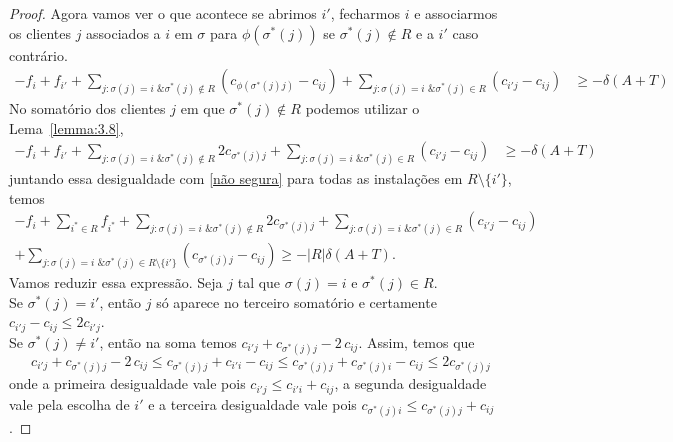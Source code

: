 \begin{proof}
    Agora vamos ver o que acontece se abrimos $i'$, fecharmos $i$ e associarmos os clientes $j$ associados a $i$ em $\sigma$ para $\phi(\sigma^*(j))$ se $\sigma^*(j) \not \in R$ e a $i'$ caso contrário.
    \begin{align*}
        - f_i + f_{i'} + \sum_{j: \sigma(j) = i \text{ \& } \sigma^*(j)\not \in R}(c_{\phi(\sigma^*(j)j)} - c_{ij}) + \sum_{j: \sigma(j)=i \text{ \& }\sigma^*(j) \in R}(c_{i'j} - c_{ij}) &\geq -\delta(A+T)
    \end{align*}
    No somatório dos clientes $j$ em que $\sigma^*(j) \not \in R$ podemos utilizar o Lema~\ref{lemma:3.8},
    \begin{align*}
        - f_i + f_{i'} + \sum_{j: \sigma(j) = i \text{ \& } \sigma^*(j)\not \in R} 2c_{\sigma^*(j)j} + \sum_{j: \sigma(j)=i \text{ \& }\sigma^*(j) \in R}(c_{i'j} - c_{ij}) &\geq -\delta(A+T)
    \end{align*}
    juntando essa desigualdade com \ref{não segura} para todas as instalações em $R\setminus\{i'\}$, temos
    \begin{align*}
        -f_i + \sum_{i^* \in R}f_{i^*} + \sum_{j: \sigma(j) = i \text{ \& } \sigma^*(j)\not \in R} 2c_{\sigma^*(j)j} + \sum_{j: \sigma(j)=i \text{ \& }\sigma^*(j) \in R}(c_{i'j} - c_{ij}) \\+ \sum_{j:\sigma(j)=i \text{ \& }\sigma^*(j) \in R \setminus\{i'\}}(c_{\sigma^*(j)j} - c_{ij}) \geq -|R|\delta(A+T).
    \end{align*}
    Vamos reduzir essa expressão. Seja $j$ tal que $\sigma(j)=i$ e $\sigma^*(j) \in R$. \\
    Se $\sigma^*(j) = i'$, então $j$ só aparece no terceiro somatório e certamente $c_{i'j} - c_{ij} \leq 2 c_{i'j}$. \\
    Se $\sigma^*(j)\neq i'$, então na soma temos $c_{i'j} + c_{\sigma^*(j)j} - 2 \,c_{ij}$. Assim, temos que
    \[
            c_{i'j} + c_{\sigma^*(j)j} - 2 \,c_{ij} \leq 
            c_{\sigma^*(j)j} + c_{i'i} - c_{ij} \leq
            c_{\sigma^*(j)j} + c_{\sigma^*(j)i} - c_{ij} \leq
            2 c_{\sigma^*(j)j}
    \]
    onde a primeira desigualdade vale pois $c_{i'j} \leq c_{i'i} + c_{ij}$, a segunda desigualdade vale pela escolha de $i'$ e a terceira desigualdade vale pois $c_{\sigma^*(j)i} \leq c_{\sigma^*(j)j} + c_{ij}$.


\end{proof}
